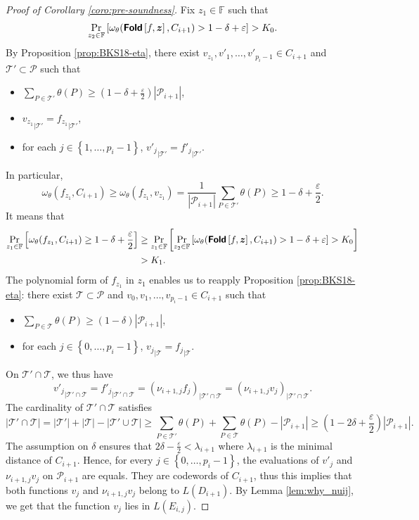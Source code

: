 \documentclass[10pt,a4paper]{article}
\renewcommand\epsilon{\varepsilon}
\newcommand\F{\mathbb{F}}
\newcommand\fold[1]{\textsf{\textbf{Fold}}\left[#1\right]}
\def\rest#1#2{{{#1}_{|#2}}}
\renewcommand{\vec}[1]{\boldsymbol{#1}}
\newcommand{\set}[1]{\left\{#1\right\}}
\newcommand{\size}[1]{\left|#1\right|}
\newcommand{\range}[1]{\set{0,\dots,#1-1}}
\newcommand{\Range}[2]{\set{#1,\dots,#2}}
\newcommand\bfz{{\vec{z}}}
\newcommand\calP{\mathcal{P}}
\newcommand\calT{\mathcal{T}}
\theoremstyle{plain}
\theoremstyle{plain}
\theoremstyle{definition}
\theoremstyle{remark}
\theoremstyle{plain}
\begin{document}
\begin{proof}[Proof of Corollary \ref{coro:pre-soundness}]
	
	Fix $z_1 \in \F$ such that \[\Pr_{z_2 \in \F} \left[\omega_\theta(\fold{f, \bfz}, C_{i+1}) > 1 - \delta + \epsilon\right] > K_0.\] By Proposition \ref{prop:BKS18-eta}, there exist $v_{z_1},v'_1,\dots,v'_{p_i-1} \in C_{i+1}$ and $\calT' \subset \calP$ such that
	\begin{itemize}
		\item $\sum_{P \in \calT'} \theta(P)  \ge (1 - \delta+ \frac{\epsilon}{2})\size{\calP_{i+1}}$,
		\item $\rest{v_{z_1}}{\calT'}=\rest{f_{z_1}}{\calT'}$,
		\item for each $j \in \Range{1}{p_i-1}$, $\rest{v'_j}{\calT'} = \rest{f'_j}{\calT'}$.
	\end{itemize}
	In particular, \[\omega_\theta(f_{z_1},C_{i+1}) \geq \omega_\theta(f_{z_1},v_{z_1}) =  \frac{1}{\size{\calP_{i+1}}}\sum_{P \in \calT'} \theta(P) \geq 1- \delta + \frac{\epsilon}{2}.\]   
	It means that
	\begin{align*}  \Pr_{z_1 \in \F} \left[\omega_\theta(f_{z_1},C_{i+1}) \geq 1-\delta+ \frac{\epsilon}{2} \right] &\geq \Pr_{z_1 \in \F}\left[ \Pr_{z_2 \in \F} \left[\omega_\theta(\fold{f, \bfz}, C_{i+1}) > 1 - \delta + \epsilon\right]  > K_0 \right] \\ &> K_1.
    \end{align*}
	The polynomial form of $f_{z_1}$ in $z_1$ enables us to reapply Proposition \ref{prop:BKS18-eta}: there exist $\calT \subset \calP$ and $v_0,v_1,\dots,v_{p_i-1} \in C_{i+1}$ such that
	\begin{itemize}
		\item $ \sum_{P \in \calT} \theta(P) \ge (1 - \delta)\size{\calP_{i+1}}$,
		\item for each $j \in \range{p_i}$, $\rest{v_j}{\calT} = \rest{f_j}{\calT}$.
	\end{itemize}
	On $\calT' \cap \calT$, we thus have \[\rest{v'_j}{\calT' \cap \calT}= \rest{f'_j}{\calT' \cap \calT}=\rest{(\nu_{i+1,j}f_j)}{\calT' \cap \calT}=\rest{(\nu_{i+1,j}v_j)}{\calT' \cap \calT}.\]
	The cardinality of $\calT' \cap \calT$ satisfies
	\[|\calT' \cap \calT| =|\calT'|+|\calT|-|\calT' \cup \calT| \geq \sum_{P \in \calT'} \theta(P)+\sum_{P \in \calT} \theta(P)-|\calP_{i+1}| \geq (1-2\delta+\frac{\epsilon}{2})|\calP_{i + 1}|.\]
	The assumption on $\delta$ ensures that $2\delta - \frac{\epsilon}{2} < \lambda_{i+1}$ where $\lambda_{i+1}$ is the minimal distance of $C_{i+1}$. Hence, for every $j \in \range{p_i}$, the evaluations of $v'_j$ and $\nu_{i+1,j}v_j$ on $\calP_{i+1}$ are equals. They are codewords of $C_{i+1}$, thus this implies that both functions $v_j$ and $\nu_{i+1,j}v_j$ belong to $L(D_{i+1})$. By Lemma \ref{lem:why_nuij}, we get that the function $v_j$ lies in $L(E_{i,j})$.
	

\end{proof}
\end{document}
